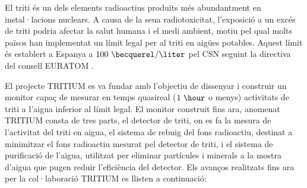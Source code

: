 El triti és un dels elements radioactius produïts més abundantment en instal·lacions nuclears. A causa de la seua radiotoxicitat, l'exposició a un excés de triti podria afectar la salut humana i el medi ambient, motiu pel qual molts països han implementat un límit legal per al triti en aigües potables. Aquest límit és establert a Espanya a $100~\becquerel/\liter$ pel CSN seguint la directiva del consell EURATOM \cite{100BqL}.

El projecte TRITIUM es va fundar amb l'objectiu de dissenyar i construir un monitor capaç de mesurar en temps quasireal ($1~\hour$ o menys) activitats de triti a l'aigua inferior al límit legal. El monitor construit fins ara, anomenat TRITIUM consta de tres parts, el detector de triti, on es fa la mesura de l'activitat del triti en aigua, el sistema de rebuig del fons radioactiu, destinat a minimitzar el fons radioactiu mesurat pel detector de triti, i el sistema de purificació de l'aigua, utilitzat per eliminar partícules i minerals a la mostra d'aigua que pugen reduir l'eficiència del detector. Els avanços realitzats fins ara per la col·laboració TRITIUM es llisten a continuació:


